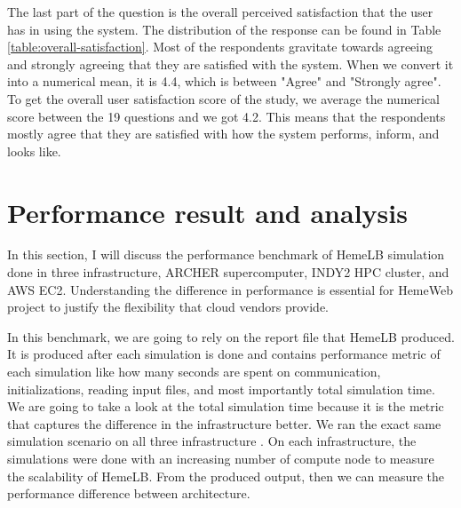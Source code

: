 The last part of the question is the overall perceived satisfaction that the user has in using the system. The distribution of the response can be found in Table \ref{table:overall-satisfaction}. Most of the respondents gravitate towards agreeing and strongly agreeing that they are satisfied with the system. When we convert it into a numerical mean, it is 4.4, which is between "Agree" and "Strongly agree". To get the overall user satisfaction score of the study, we average the numerical score between the 19 questions and we got 4.2. This means that the respondents mostly agree that they are satisfied with how the system performs,  inform, and looks like.




\section{Performance result and analysis}

In this section, I will discuss the performance benchmark of HemeLB simulation done in three infrastructure, ARCHER supercomputer, INDY2 HPC cluster, and AWS EC2. Understanding the difference in performance is essential for HemeWeb project to justify the flexibility that cloud vendors provide.

In this benchmark, we are going to rely on the report file that HemeLB produced. It is produced after each simulation is done and contains performance metric of each simulation like how many seconds are spent on communication, initializations, reading input files, and most importantly total simulation time. We are going to take a look at the total simulation time because it is the metric that captures the difference in the infrastructure better. We ran the exact same simulation scenario on all three infrastructure . On each infrastructure, the simulations were done with an increasing number of compute node to measure the scalability of HemeLB.  From the produced output, then we can measure the performance difference between architecture.





